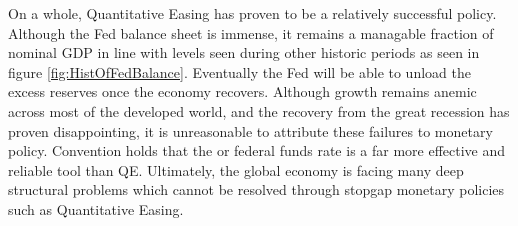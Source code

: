 \documentclass[12pt]{report}
\begin{document}
On a whole, Quantitative Easing has proven to be a relatively successful policy.
Although the Fed balance sheet is immense, it remains a managable fraction of nominal GDP in line with levels seen during other historic periods as seen in figure \ref{fig:HistOfFedBalance}.
Eventually the Fed will be able to unload the excess reserves once the economy recovers.\autocite[4]{ricketts2014rise}
Although growth remains anemic across most of the developed world, and the recovery from the great recession has proven disappointing, it is unreasonable to attribute these failures to monetary policy.
Convention holds that the or federal funds rate is a far more effective and reliable tool than QE.\autocite[465]{blinder2010quantitative}
Ultimately, the global economy is facing many deep structural problems which cannot be resolved through stopgap monetary policies such as Quantitative Easing.


\begin{appendices}



\end{appendices}

\nocite{*}
\printbibliography
\end{document}

